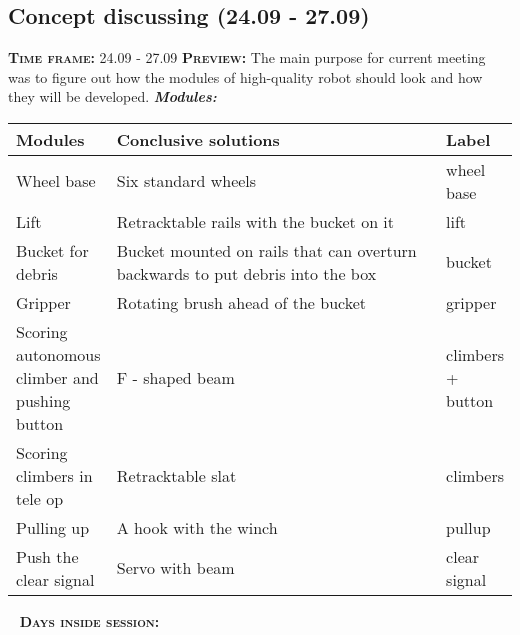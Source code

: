 \subsection{Concept discussing (24.09 - 27.09)}
    \textsc{\textbf{Time frame:}} 24.09 - 27.09 \newline
	\textsc{\textbf{Preview:}} The main purpose for current meeting was to figure out how the modules of high-quality robot should look and how they will be developed.\newline \newline
	\textit{\textbf{Modules:}}
	
	\begin{table}[H]
		\vspace{-2mm}
		\begin{center}
			\begin{tabular}{|p{0.2\linewidth}|p{0.7\linewidth}|p{0.1\linewidth}|}
				\hline
				Modules & Conclusive solutions & Label \\
				\hline
				Wheel base & Six standard wheels & wheel base \\
				\hline
				Lift & Retracktable rails with the bucket on it & lift \\
				\hline
				Bucket for debris & Bucket mounted on rails that can overturn backwards to put debris into the box & bucket \\
				\hline
				Gripper & Rotating brush ahead of the bucket & gripper\\
				\hline
				Scoring autonomous climber and pushing button & F - shaped beam & climbers + button\\
				\hline
				Scoring climbers in tele op & Retracktable slat & climbers\\
				\hline
				Pulling up & A hook with the winch & pullup\\
				\hline
				Push the clear signal & Servo with beam & clear signal\\
				\hline
			\end{tabular}
		\end{center}
	\end{table}
  
   \newline
  \textsc{\textbf{Days inside session:}}
  